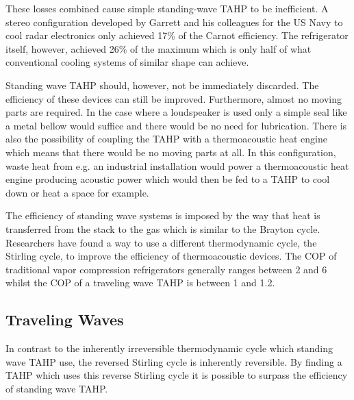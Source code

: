 \documentclass[a4paper]{article}
\newcommand{\newpara}
    {
      \bigbreak{}
      \noindent
    }
\begin{document}
These losses combined cause simple standing-wave TAHP to be inefficient. A stereo configuration developed by Garrett\cite{powerofsound} and his colleagues for the US Navy to cool radar electronics only achieved 17\% of the Carnot efficiency. The refrigerator itself, however, achieved 26\% of the maximum which is only half of what conventional cooling systems of similar shape can achieve. %
\newpara{}
Standing wave TAHP should, however, not be immediately discarded. The efficiency of these devices can still be improved. Furthermore, almost no moving parts are required. In the case where a loudspeaker is used only a simple seal like a metal bellow would suffice and there would be no need for lubrication. There is also the possibility of coupling the TAHP with a thermoacoustic heat engine which means that there would be no moving parts at all. In this configuration, waste heat from e.g. an industrial installation would power a thermoacoustic heat engine producing acoustic power which would then be fed to a TAHP to cool down or heat a space for example.
\newpara{}
The efficiency of standing wave systems is imposed by the way that heat is transferred from the stack to the gas which is similar to the Brayton cycle. Researchers have found a way to use a different thermodynamic cycle, the Stirling cycle, to improve the efficiency of thermoacoustic devices.\cite{ceperleyStirling}
The COP of traditional vapor compression refrigerators generally ranges between 2 and 6 whilst the COP of a traveling wave TAHP is between 1 and 1.2.\cite{Herman2006,tijaniOptimalStack}

\subsection{Traveling Waves\cite{spoelstraHighTemperature,BackHauseDetailedStudy,powerofsound,weiTravellingwave}}
In contrast to the inherently irreversible thermodynamic cycle which standing wave TAHP use, the reversed Stirling cycle is inherently reversible. By finding a TAHP which uses this reverse Stirling cycle it is possible to surpass the efficiency of standing wave TAHP.\@
\end{document}
